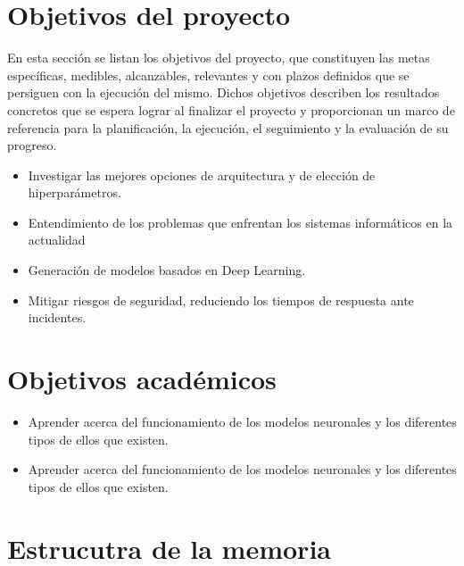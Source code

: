  
\section{Objetivos del proyecto} \label{sec.objetivos-pro}
En esta sección se listan los objetivos del proyecto, que constituyen las metas específicas, medibles, alcanzables, relevantes y con plazos definidos que se persiguen con la ejecución del mismo. Dichos objetivos describen los resultados concretos que se espera lograr al finalizar el proyecto y proporcionan un marco de referencia para la planificación, la ejecución, el seguimiento y la evaluación de su progreso.

\begin{itemize}
\item Investigar las mejores opciones de arquitectura y de elección de hiperparámetros.
\item Entendimiento de los problemas que enfrentan los sistemas informáticos en la actualidad
\item Generación de modelos basados en Deep Learning.
\item Mitigar riesgos de seguridad, reduciendo los tiempos de respuesta ante incidentes.

\end{itemize}


\section{Objetivos académicos} \label{sec.objetivos-aca}
\begin{itemize}
\item Aprender acerca del funcionamiento de los modelos neuronales y los diferentes tipos de ellos que existen.
\item Aprender acerca del funcionamiento de los modelos neuronales y los diferentes tipos de ellos que existen.
\end{itemize}


\section{Estrucutra de la memoria} \label{sec.estr-memoria}


